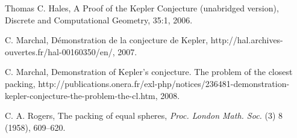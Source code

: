 

\backmatter


\begin{thebibliography}{CHMS94}

 Thomas C. Hales, A Proof of the
Kepler Conjecture (unabridged version), 
Discrete and Computational Geometry, 35:1, 2006.

 C. Marchal, D\'emonstration de la conjecture de Kepler,
http://hal.archives-ouvertes.fr/hal-00160350/en/, 2007.

 C. Marchal, Demonstration of Kepler's conjecture. The problem of the closest packing, http://publications.onera.fr/exl-php/notices/236481-demonstration-kepler-conjecture-the-problem-the-cl.htm, 2008.

 C. A. Rogers, The packing of equal spheres, {\it Proc. London Math.
    Soc.} (3) 8 (1958), 609--620.


\end{thebibliography}



